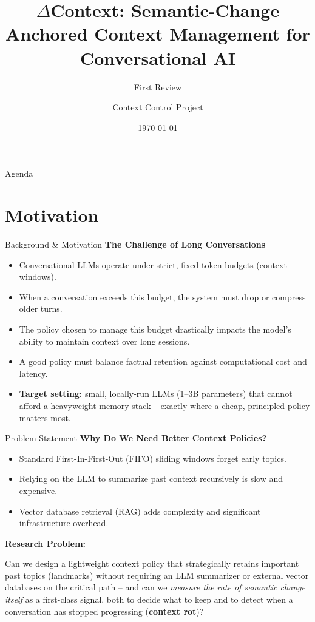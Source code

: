 \documentclass[aspectratio=169]{beamer}
\title[$\Delta$Context Policy]{$\Delta$Context: Semantic-Change Anchored Context Management for Conversational AI}
\subtitle{First Review}
\author{Context Control Project}
\institute{Deep Learning \& NLP}
\date{\today}
\begin{document}
\begin{frame}
  \titlepage
\end{frame}

\begin{frame}{Agenda}
  \tableofcontents
\end{frame}

\section{Motivation}

\begin{frame}{Background \& Motivation}
  \textbf{The Challenge of Long Conversations}
  \begin{itemize}
    \item Conversational LLMs operate under strict, fixed token budgets (context windows).
    \item When a conversation exceeds this budget, the system must drop or compress older turns.
    \item The policy chosen to manage this budget drastically impacts the model's ability to maintain context over long sessions.
    \item A good policy must balance factual retention against computational cost and latency.
    \item \textbf{Target setting:} small, locally-run LLMs (1--3B parameters) that cannot afford a heavyweight memory stack -- exactly where a cheap, principled policy matters most.
  \end{itemize}
\end{frame}

\begin{frame}{Problem Statement}
  \textbf{Why Do We Need Better Context Policies?}
  \begin{itemize}
      \item Standard First-In-First-Out (FIFO) sliding windows forget early topics.
      \item Relying on the LLM to summarize past context recursively is slow and expensive.
      \item Vector database retrieval (RAG) adds complexity and significant infrastructure overhead.
  \end{itemize}

  \vspace{0.5cm}
  \textbf{Research Problem:}
  \begin{block}{}
      Can we design a lightweight context policy that strategically retains important past topics (landmarks) without requiring an LLM summarizer or external vector databases on the critical path -- and can we \emph{measure the rate of semantic change itself} as a first-class signal, both to decide what to keep and to detect when a conversation has stopped progressing (\textbf{context rot})?
  \end{block}
\end{frame}
\end{document}
